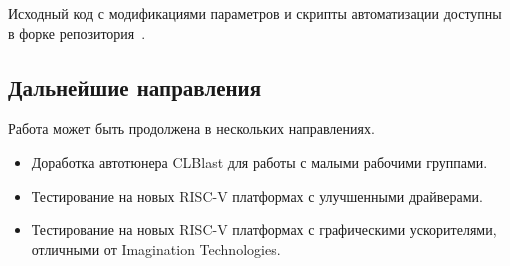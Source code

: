 Исходный код с модификациями параметров и скрипты автоматизации доступны в форке репозитория~\cite{mygemm_repo_test}.

\subsection*{Дальнейшие направления}

Работа может быть продолжена в нескольких направлениях.

\begin{itemize}
\item Доработка автотюнера CLBlast для работы с малыми рабочими группами.
\item Тестирование на новых RISC-V платформах с улучшенными драйверами.
\item Тестирование на новых RISC-V платформах с графическими ускорителями, отличными от Imagination Technologies.
\end{itemize}